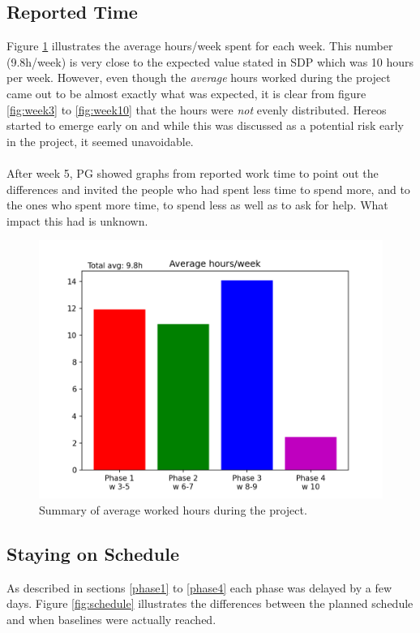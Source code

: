 \documentclass{article}
\begin{document}
    \subsection{Reported Time \label{reported_time}}
        Figure \ref{fig:final} illustrates the average hours/week spent for each week.
        This number (9.8h/week) is very close to the expected value stated in SDP which was 10
        hours per week. However, even though the \emph{average} hours worked during the project came out to be 
        almost exactly what was expected, it is clear from figure \ref{fig:week3} to \ref{fig:week10}
        that the hours were \emph{not} evenly distributed. Hereos started to emerge early
        on and while this was discussed as a potential risk early in the project, it seemed unavoidable.
        \\ \\
        After week 5, PG showed graphs from reported work time to point out the differences and 
        invited the people who had spent less time to spend more, and to the ones who spent more time,
        to spend less as well as to ask for help. What impact this had is unknown.
    
        \begin{figure}[!htb]
            \centering
              \includegraphics[width=\linewidth]{images/final.png}
              \caption{Summary of average worked hours during the project.}\label{fig:final}
            \endminipage\hfill
        \end{figure}

    \subsection{Staying on Schedule}
        As described in sections \ref{phase1} to \ref{phase4} each phase was
        delayed by a few days. Figure \ref{fig:schedule}
        illustrates the differences between the planned schedule and when
        baselines were actually reached.
        
\end{document}

